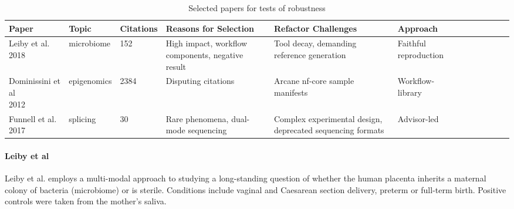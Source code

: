 \documentclass{drexelthesis}
\begin{document}
\begin{table}[H]
\begin{adjustbox}{max width=\textwidth}
\begin{tabular}{p{2.75cm}p{2.75cm}p{2.06cm}p{3.44cm}p{2.75cm}p{2.75cm}p{2.75cm}p{2.75cm}p{2.06cm}p{3.44cm}p{2.75cm}p{2.75cm}}
\hline
\multicolumn{1}{|p{2.75cm}}{Paper} & 
\multicolumn{1}{|p{2.75cm}}{Topic} & 
\multicolumn{1}{|p{2.06cm}}{Citations} & 
\multicolumn{1}{|p{3.44cm}}{Reasons for Selection} & 
\multicolumn{1}{|p{2.75cm}}{Refactor Challenges} & 
\multicolumn{1}{|p{2.75cm}|}{Approach} \\ 
\hline
\multicolumn{1}{|p{2.75cm}}{Leiby et al. 2018} & 
\multicolumn{1}{|p{2.75cm}}{microbiome} & 
\multicolumn{1}{|p{2.06cm}}{152} & 
\multicolumn{1}{|p{3.44cm}}{High impact, workflow components, negative result} & 
\multicolumn{1}{|p{2.75cm}}{Tool decay, demanding reference generation} & 
\multicolumn{1}{|p{2.75cm}|}{Faithful reproduction} \\ 
\hline
\multicolumn{1}{|p{2.75cm}}{Dominissini et al \newline
2012} & 
\multicolumn{1}{|p{2.75cm}}{epigenomics} & 
\multicolumn{1}{|p{2.06cm}}{2384} & 
\multicolumn{1}{|p{3.44cm}}{Disputing citations} & 
\multicolumn{1}{|p{2.75cm}}{Arcane nf-core sample manifests} & 
\multicolumn{1}{|p{2.75cm}|}{Workflow-library} \\ 
\hline
\multicolumn{1}{|p{2.75cm}}{Funnell et al. 2017} & 
\multicolumn{1}{|p{2.75cm}}{splicing} & 
\multicolumn{1}{|p{2.06cm}}{30} & 
\multicolumn{1}{|p{3.44cm}}{Rare phenomena, dual-mode sequencing} & 
\multicolumn{1}{|p{2.75cm}}{Complex experimental design, deprecated sequencing formats} & 
\multicolumn{1}{|p{2.75cm}|}{Advisor-led} \\ 
\hline
\end{tabular}
\end{adjustbox}
\caption{Selected papers for tests of robustness}
\end{table}
\paragraph{Leiby et al}

Leiby et al. \cite{Leiby2018-lf} employs a multi-modal approach to studying a long-standing question of whether the human placenta inherits a maternal colony of bacteria (microbiome) or is sterile. Conditions include vaginal and Caesarean section delivery, preterm or full-term birth. Positive controls were taken from the mother's saliva.
\end{document}
